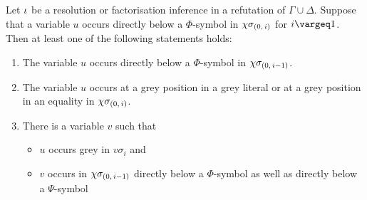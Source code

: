\documentclass[,%
	draft=false,%
	numbers=noendperiod
	12pt,
	a4paper,
	oneside,%
	openany,
]{memoir}
\newcommand{\inv}{\ensuremath{\chi}}
\begin{document}
\begin{lemma}
	\label{lemma:var_below_phi_symbol}
	Let $\iota$ be a resolution or factorisation inference in a refutation of $\Gamma\cup\Delta$.
	Suppose that a variable $u$ occurs directly below a $\Phi$-symbol in $\inv\sigmazi$ for $i\vargeq 1$.
	Then at least one of the following statements holds:
	\begin{enumerate}
		\item
			\label{14_1}
			The variable $u$ occurs directly below a $\Phi$-symbol in $\inv\sigmazmi$.

		\item
			\label{14_5}
			The variable $u$ occurs at a grey position in a grey literal or at a grey position in an equality in $\inv\sigmazi$.

		\item 
			\label{14_2}
			There is a variable $v$ such that 
			{
				\renewcommand{\labelitemi}{\textendash}
				\begin{itemize}
					\item $u$ occurs grey in $v\sigma_i$ and
					\item $v$ occurs in $\inv\sigmazmi$ directly below a $\Phi$-symbol as well as directly below a $\Psi$-symbol
				\end{itemize}
			}

	\end{enumerate}
\end{lemma}
\end{document}
